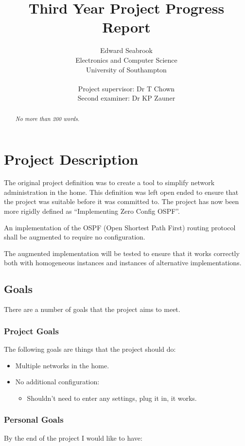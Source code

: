 \documentclass[12pt]{report}
\author{Edward Seabrook \\ 
Electronics and Computer Science \\ 
University of Southampton \\ \\
Project supervisor: Dr T Chown \\
Second examiner: Dr KP Zauner}
\title{Third Year Project Progress Report}
\begin{document}



\begin{abstract}
\em No more than 200 words. \em


\end{abstract}

\tableofcontents

\chapter{Project Description}

The original project definition was to create a tool to simplify network
administration in the home.  This definition was left open ended to ensure that
the project was suitable before it was committed to.  The project has now been
more rigidly defined as ``Implementing Zero Config OSPF''.

An implementation of the OSPF (Open Shortest Path First) routing protocol shall
be augmented to require no configuration.

The augmented implementation will be tested to ensure that it works correctly
both with homogeneous instances and instances of alternative implementations. 

\section{Goals}

There are a number of goals that the project aims to meet.

\subsection{Project Goals }
The following goals are things that the project should do:

\begin{itemize}

	\item Multiple networks in the home. 

	\item No additional configuration:

		\begin{itemize}	
  		\item Shouldn't need to enter any settings, plug it in, it works. 
		\end{itemize}
\end{itemize}

\subsection{Personal Goals}
By the end of the project I would like to have:
\end{document}
